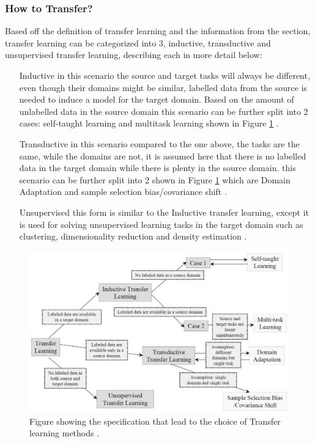 \subsubsection{How to Transfer?}
Based off the definition of transfer learning and the information from the section, transfer learning can be categorized into 3, inductive, transductive and unsupervised transfer learning, describing each in more detail below:
\begin{itemize}
	\item[Inductive ] in this scenario the source and target tasks will always be different, even though their domains might be similar, labelled data from the source is needed to induce a model for the target domain. Based on the amount of unlabelled data in the source domain this scenario can be further split into 2 cases: self-taught learning and multitask learning shown in Figure \ref{fig:pantl} \cite{Pan2010}.
	\item[Transductive] in this scenario compared to the one above, the tasks are the same, while the domains are not, it is assumed here that there is no labelled data in the target domain while there is plenty in the source domain. this scenario can be further split into 2 shown in Figure \ref{fig:pantl} which are Domain Adaptation and sample selection bias/covariance shift \cite{Pan2010}.
	\item[Unsupervised] this form is similar to the Inductive transfer learning, except it is used for solving unsupervised learning tasks in the target domain such as clustering, dimensionality reduction and density estimation \cite{Pan2010}.
\end{itemize}
\begin{figure}[p]
	\centering
	\includegraphics[width=1.1\linewidth]{figures/ch2/pantl}
	\caption{Figure showing the specification that lead to the choice of Transfer learning methods \cite{Pan2010}.}
	\label{fig:pantl}
\end{figure}